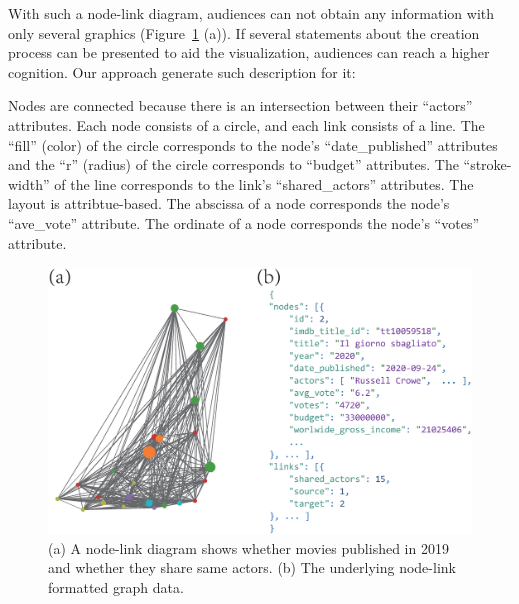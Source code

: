 With such a node-link diagram, audiences can not obtain any information with only several graphics (Figure~\ref{fig:IMDbDiagram} (a)).
If several statements about the creation process can be presented to aid the visualization, audiences can reach a higher cognition.
Our approach generate such description for it:
\begin{lightgrayleftbar}\noindent
    Nodes are connected because there is an intersection between their ``actors'' attributes.
    Each node consists of a circle, and each link consists of a line.
    The ``fill'' (color) of the circle corresponds to the node's ``date\_published'' attributes and the ``r'' (radius) of the circle corresponds to ``budget'' attributes.
    The ``stroke-width'' of the line corresponds to the link's ``shared\_actors'' attributes.
    The layout is attribtue-based.
    The abscissa of a node corresponds the node's ``ave\_vote'' attribute.
    The ordinate of a node corresponds the node's ``votes'' attribute.
\end{lightgrayleftbar}

\begin{figure}
    \centering
    \includegraphics[width=1\columnwidth]{firgures/IMDbDiagram}
    \caption{ (a) A node-link diagram shows whether movies published in 2019 and whether they share same actors. (b) The underlying node-link formatted graph data.}
    \label{fig:IMDbDiagram}
\end{figure}

